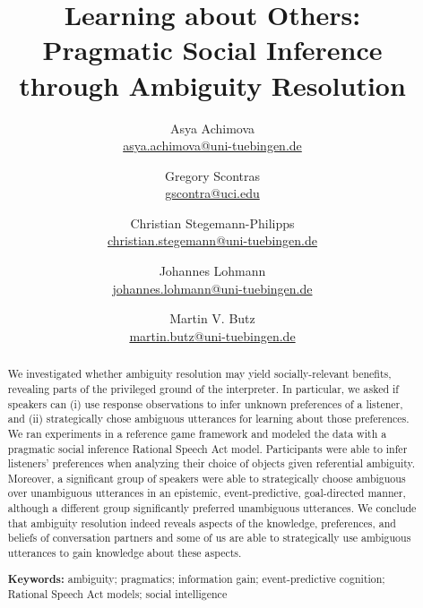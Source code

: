\documentclass[11pt,a4paper]{article}
\title{Learning about Others:\\
	Pragmatic Social Inference \\ through Ambiguity Resolution
}
\author{
		Asya Achimova\\
		\href{mailto:asya.achimova@uni-tuebingen.de}{asya.achimova@uni-tuebingen.de}
	\and
		Gregory Scontras\\
		\href{mailto:gscontra@uci.edu}{gscontra@uci.edu}
	\and 
		Christian Stegemann-Philipps\\
		\href{mailto:christian.stegemann@uni-tuebingen.de}{christian.stegemann@uni-tuebingen.de}
	\and
		Johannes Lohmann\\
		\href{mailto:johannes.lohmann@uni-tuebingen.de}{johannes.lohmann@uni-tuebingen.de}
	\and
		Martin V. Butz \\
		\href{mailto:martin.butz@uni-tuebingen.de}{martin.butz@uni-tuebingen.de}
}
\begin{document}
\maketitle

\begin{abstract}
We investigated whether ambiguity resolution may yield socially-relevant benefits,
revealing parts of the privileged ground of the interpreter. 
In particular, we asked if speakers can (i) use response observations to infer unknown preferences of a listener, and (ii) strategically chose ambiguous utterances for learning about those preferences. 
We ran experiments in a reference game framework and modeled the data with a pragmatic social inference Rational Speech Act model.
Participants were able to infer listeners' preferences when analyzing their choice of objects given referential ambiguity.
Moreover, a significant group of speakers were able to strategically choose ambiguous over unambiguous utterances in an epistemic, event-predictive, goal-directed manner, although a different group significantly preferred unambiguous utterances. 
We conclude that ambiguity resolution indeed reveals aspects of the knowledge, preferences, and beliefs of conversation partners and some of us are able to strategically use ambiguous utterances to gain knowledge about these aspects.

\textbf{Keywords:} 
ambiguity; pragmatics; information gain; event-predictive cognition; Rational Speech Act models; social intelligence
\end{abstract}
\end{document}
